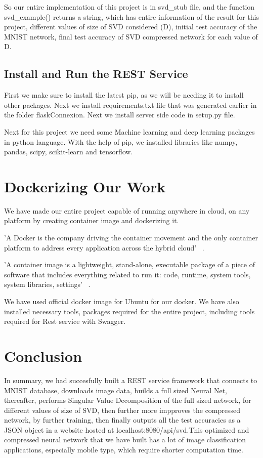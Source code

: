 So our entire implementation of this project is in svd\_stub file, and the
function svd\_example() returns a string, which has entire information of the
result for this project, different values of size of SVD considered (D), initial
test accuracy of the MNIST network, final test accuracy of SVD compressed
network for each value of D.

\subsection{Install and Run the REST Service}

First we make sure to install the latest pip, as we will be needing it to
install other packages. Next we install requirements.txt file that was generated
earlier in the folder flaskConnexion. Next we install server side code in
setup.py file.

Next for this project we need some Machine learning and deep learning packages
in python language. With the help of pip, we installed libraries like numpy,
pandas, scipy, scikit-learn and tensorflow.


\section{Dockerizing Our Work}

We have made our entire project capable of running anywhere in cloud, on any
platform by creating container image and dockerizing it.

'A Docker is the company driving the container movement and the only container
 platform to address every application across the hybrid cloud'
 ~\cite{hid-sp18-401-Docker}.

'A container image is a lightweight, stand-alone, executable package of a piece
 of software that includes everything related to run it: code, runtime, system
 tools, system libraries, settings' ~\cite{hid-sp18-401-Container}.

We have used official docker image for Ubuntu for our docker. We have also
installed necessary tools, packages required for the entire project, including
tools required for Rest service with Swagger.

\section{Conclusion}

In summary, we had succesfully built a REST service framework that connects to
MNIST database, downloads image data, builds a full sized Neural Net,
thereafter, performs Singular Value Decomposition of the full sized network, for
different values of size of SVD, then further more impproves the compressed
network, by further training, then finally outputs all the test accuracies as a
JSON object in a website hosted at localhost:8080/api/svd.This optimized and
compressed neural network that we have built has a lot of image classification
applications, especially mobile type, which require  shorter computation time.


